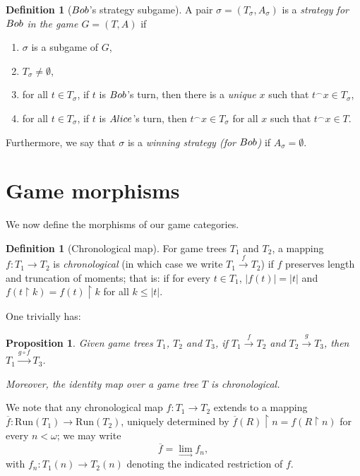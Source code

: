 \documentclass[12pt]{amsart}
\newtheorem{prop}[thm]{Proposition}
\theoremstyle{definition}
\newtheorem{defn}[thm]{Definition}
\newcommand{\ali}{\textup{\textmd{\textsc{Alice}}}}
\newcommand{\bob}{\textup{\textmd{\textsc{Bob}}}}
\newcommand{\Run}{{\mathrm{Run}}}
\DeclareMathOperator{\restrict}{\upharpoonright}
\begin{document}
\begin{defn}[$\bob$'s strategy subgame]\label{DEF_BStrat}
	A pair $\sigma = (T_\sigma, A_\sigma)$ is a \textit{strategy for $\bob$ in the game $G=(T,A)$} if 
	\begin{enumerate}
		\item[(a)] $\sigma$ is a subgame of $G$,
		\item [(b)] $T_\sigma\neq \emptyset$,
		\item[(c)] for all $t\in T_\sigma$, if $t$ is $\bob$'s turn, then there is a \textit{unique} $x$ such that $t^\smallfrown x\in T_\sigma$,
		\item[(d)] for all $t\in T_\sigma$, if $t$ is $\ali$'s turn, then $t^\smallfrown x\in T_\sigma$ for all $x$ such that $t^\smallfrown x \in T$.
	\end{enumerate} 
	Furthermore, we say that $\sigma$ is a \textit{winning strategy (for $\bob$)} if $A_\sigma = \emptyset$.
\end{defn}





\section{Game morphisms}\label{SEC_Morph}
We now define the morphisms of our game categories.
\begin{defn}[Chronological map]\label{DEF_fChronological}
	For game trees $T_1$ and $T_2$, a mapping $f\colon T_1\to T_2$ is \textit{chronological} (in which case we write $T_1\stackrel{f}{\to}T_2$) if $f$ preserves length and truncation of moments; that is: if for every $t\in T_1$, $|f(t)|=|t|$ and $f(t\restrict k)=f(t)\restrict k$ for all $k\le |t|$.
\end{defn}  


One trivially has:
\begin{prop}\label{PROP_morphcat_gme}
	Given game trees $T_1$, $T_2$ and $T_3$, if $T_1\stackrel{f}{\to}T_2$ and $T_2\stackrel{g}{\to}T_3$, then $T_1\stackrel{g\circ f}{\to}T_3$.
	
	Moreover, the identity map over a game tree $T$ is chronological.
\end{prop}


We note that any chronological map $f\colon T_1\to T_2$ extends to a mapping $\overline{f}\colon \Run(T_1)\to \Run(T_2)$, uniquely determined by  $\overline{f}(R)\restrict n=f(R\upharpoonright n)$ for every $n<\omega$; we may write
\[
\overline{f}=\lim_{\longrightarrow}f_n,
\]
with $f_n: T_1(n)\to T_2(n)$ denoting the indicated restriction of $f$.
\end{document}
